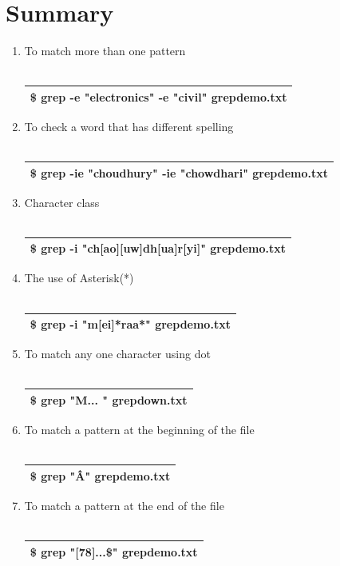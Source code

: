 \documentclass[12pt, a4paper]{report}
\begin{document}
\section{Summary}
\begin{enumerate}
\item To match more than one pattern\\
\\
\begin{tabular}{|l|}\hline
\$ grep -e "electronics" -e "civil" grepdemo.txt\\ \hline
\end{tabular}
\item To check a word that has different spelling\\
\\
\begin{tabular}{|l|}\hline
\$ grep -ie "choudhury" -ie "chowdhari" grepdemo.txt\\ \hline
\end{tabular}
\item Character class\\
\\
\begin{tabular}{|l|}\hline
\$ grep -i "ch[ao][uw]dh[ua]r[yi]" grepdemo.txt\\ \hline
\end{tabular}
\item The use of Asterisk(*)\\
\\
\begin{tabular}{|l|}\hline
\$ grep -i "m[ei]*raa*" grepdemo.txt\\ \hline
\end{tabular}
\item To match any one character using dot\\
\\
\begin{tabular}{|l|}\hline
\$ grep "M... " grepdown.txt\\ \hline
\end{tabular}
\item To match a pattern at the beginning of the file\\
\\
\begin{tabular}{|l|}\hline
\$ grep "\^A" grepdemo.txt\\ \hline
\end{tabular}
\item To match a pattern at the end of the file\\
\\
\begin{tabular}{|l|}\hline
\$ grep "[78]...\$" grepdemo.txt\\ \hline
\end{tabular}
\end{enumerate}
\end{document}
